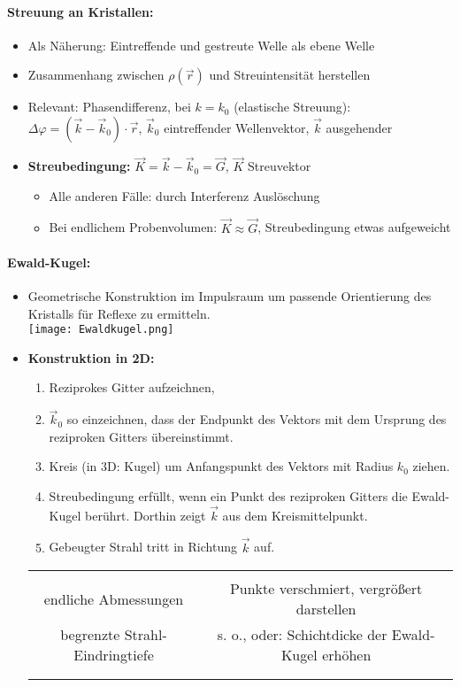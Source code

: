 \documentclass[a4paper,12pt]{article}
\begin{document}
\paragraph*{Streuung an Kristallen:}
\begin{itemize}
	\item Als Näherung: Eintreffende und gestreute Welle als ebene Welle
	\item Zusammenhang zwischen $ \rho(\vec r) $ und Streuintensität herstellen
	\item Relevant: Phasendifferenz, bei $ k=k_0 $ (elastische Streuung): $ \Delta \varphi = \left(\vec k - \vec k_0\right)\cdot \vec r $, $ \vec k_0 $ eintreffender Wellenvektor, $ \vec k $ ausgehender
	\item \textbf{Streubedingung:} $ \vec K = \vec k - \vec k_0 = \vec G $, $ \vec K $ Streuvektor \begin{itemize}
		\item Alle anderen Fälle: durch Interferenz Auslöschung
		\item Bei endlichem Probenvolumen: $  \vec K \approx \vec G $, Streubedingung etwas aufgeweicht
	\end{itemize}
\end{itemize}
\paragraph*{Ewald-Kugel:}
\begin{itemize}
	\item Geometrische Konstruktion im Impulsraum um passende Orientierung des Kristalls für Reflexe zu ermitteln.\\
	\texttt{[image: Ewaldkugel.png]}
	\item \textbf{Konstruktion in 2D:} \begin{enumerate}
		\item Reziprokes Gitter aufzeichnen,
		\item $ \vec k_0 $ so einzeichnen, dass der Endpunkt des Vektors mit dem Ursprung des reziproken Gitters übereinstimmt. 
		\item Kreis (in 3D: Kugel) um Anfangspunkt des Vektors mit Radius $ k_0 $ ziehen.
		\item Streubedingung erfüllt, wenn ein Punkt des reziproken Gitters die Ewald-Kugel berührt. Dorthin zeigt $ \vec k $ aus dem Kreismittelpunkt.
		\item  Gebeugter Strahl tritt in Richtung $ \vec k $ auf.
	\end{enumerate}
	\begin{tabular}{|c|c|}
		  &  \\ 
		endliche Abmessungen  & Punkte verschmiert, vergrößert darstellen \\ 
		begrenzte Strahl-Eindringtiefe  & s. o., oder: Schichtdicke der Ewald-Kugel erhöhen \\ 
		  &  \\ 
		  &  \\ 
		\hline 
	\end{tabular}  
\end{itemize}
\end{document}
